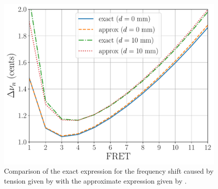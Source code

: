 \begin{figure}
  \centering
  \includegraphics[width=5.0in]{figures/tnu_test}
  \caption{\label{fig:tnu_test} Comparison of the exact expression for the frequency shift caused by tension given by  with the approximate expression given by .}
\end{figure}

